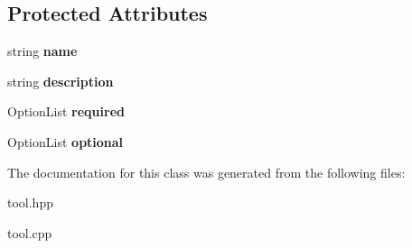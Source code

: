 \subsection*{Protected Attributes}
\begin{DoxyCompactItemize}
\item 
\hypertarget{classpct_1_1_tool_ad34b25a892c0692fdfb78c5321099c00}{string {\bfseries name}}\label{classpct_1_1_tool_ad34b25a892c0692fdfb78c5321099c00}

\item 
\hypertarget{classpct_1_1_tool_aecbec496ecac64124b3d0c8c40ae67ed}{string {\bfseries description}}\label{classpct_1_1_tool_aecbec496ecac64124b3d0c8c40ae67ed}

\item 
\hypertarget{classpct_1_1_tool_a240637721a7943cebd3feb2af447697e}{Option\-List {\bfseries required}}\label{classpct_1_1_tool_a240637721a7943cebd3feb2af447697e}

\item 
\hypertarget{classpct_1_1_tool_a4f59ff09a9258a744f1bbabd5e98835e}{Option\-List {\bfseries optional}}\label{classpct_1_1_tool_a4f59ff09a9258a744f1bbabd5e98835e}

\end{DoxyCompactItemize}


The documentation for this class was generated from the following files\-:\begin{DoxyCompactItemize}
\item 
tool.\-hpp\item 
tool.\-cpp\end{DoxyCompactItemize}
